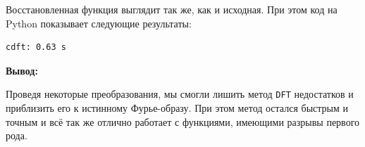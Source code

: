 \documentclass[a4paper]{article}
\begin{document}
Восстановленная функция выглядит так же, как и исходная. При этом код на Python показывает следующие результаты:\vspace{-0.5em}
\begin{center}
    \begin{minipage}{0.3\textwidth}
        \begin{lstlisting}
cdft: 0.63 s
\end{lstlisting}
    \end{minipage}
\end{center} \vspace{-0.5em}
\textbf{Вывод:}
\begin{quotebox}
    Проведя некоторые преобразования, мы смогли лишить метод \texttt{DFT} недостатков и приблизить его к истинному Фурье-образу. При этом метод остался быстрым и точным и всё так же отлично работает с функциями, имеющими разрывы первого рода.
\end{quotebox}
\end{document}
